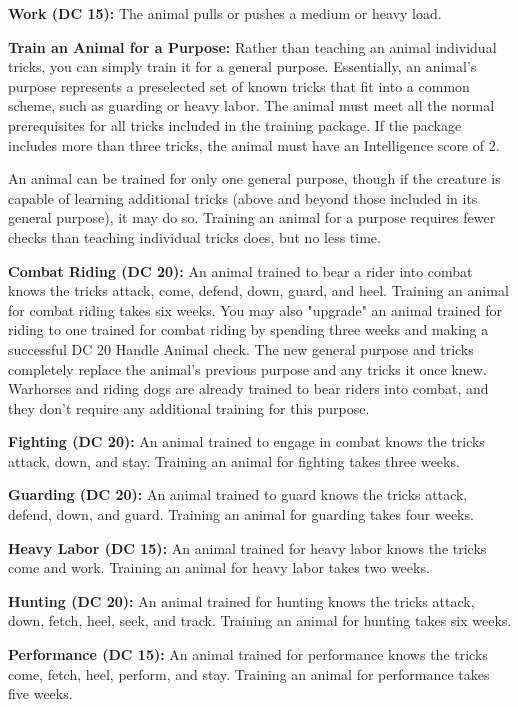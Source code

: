 \textbf{Work (DC 15):} The animal pulls or pushes a medium or heavy load.

\vspace{12pt}
\textbf{Train an Animal for a Purpose:} Rather than teaching an animal individual tricks, you can simply train it for a general purpose. Essentially, an animal's purpose represents a preselected set of known tricks that fit into a common scheme, such as guarding or heavy labor. The animal must meet all the normal prerequisites for all tricks included in the training package. If the package includes more than three tricks, the animal must have an Intelligence score of 2.

An animal can be trained for only one general purpose, though if the creature is capable of learning additional tricks (above and beyond those included in its general purpose), it may do so. Training an animal for a purpose requires fewer checks than teaching individual tricks does, but no less time. 

\textbf{Combat Riding (DC 20):} An animal trained to bear a rider into combat knows the tricks attack, come, defend, down, guard, and heel. Training an animal for combat riding takes six weeks. You may also "upgrade" an animal trained for riding to one trained for combat riding by spending three weeks and making a successful DC 20 Handle Animal check. The new general purpose and tricks completely replace the animal's previous purpose and any tricks it once knew. Warhorses and riding dogs are already trained to bear riders into combat, and they don't require any additional training for this purpose.

\textbf{Fighting (DC 20):} An animal trained to engage in combat knows the tricks attack, down, and stay. Training an animal for fighting takes three weeks.

\textbf{Guarding (DC 20):} An animal trained to guard knows the tricks attack, defend, down, and guard. Training an animal for guarding takes four weeks.

\textbf{Heavy Labor (DC 15):} An animal trained for heavy labor knows the tricks come and work. Training an animal for heavy labor takes two weeks.

\textbf{Hunting (DC 20):} An animal trained for hunting knows the tricks attack, down, fetch, heel, seek, and track. Training an animal for hunting takes six weeks.

\textbf{Performance (DC 15):} An animal trained for performance knows the tricks come, fetch, heel, perform, and stay. Training an animal for performance takes five weeks.

